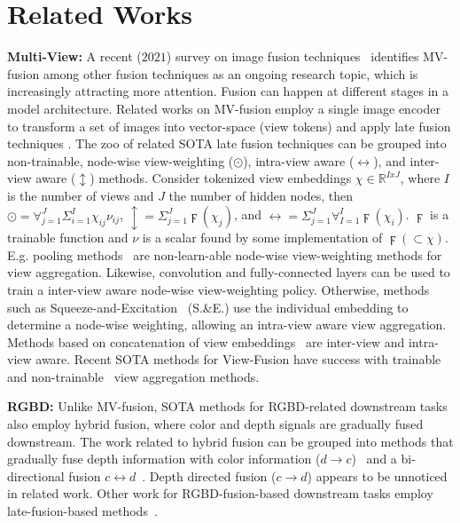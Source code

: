 \section{Related Works}
\textbf{Multi-View:} A recent ($2021$) survey on image fusion techniques~\cite{fusion_survey} identifies MV-fusion among other fusion techniques as an ongoing research topic, which is increasingly attracting more attention. Fusion can happen at different stages in a model architecture. Related works on MV-fusion employ a single image encoder to transform a set of images into vector-space (view tokens) and apply late fusion techniques \cite{mvcnn,View-GCN,MVTN,GVCNN,GIFT,MVFusionNet,RotationNet,MLVCNN,concat1,concat2,concat3,Multi-View_ML,sum_fuse}. The zoo of related SOTA late fusion techniques can be grouped into non-trainable, node-wise view-weighting ($\odot$), intra-view aware ($\leftrightarrow$), and inter-view aware ($\updownarrow$) methods. Consider tokenized view embeddings $\chi \in \mathbb{R}^{IxJ}$, where $I$ is the number of views and $J$ the number of hidden nodes, then $\odot = \forall_{j=1}^{J} \Sigma_{i=1}^{I} \chi_{ij}\nu_{ij}$, $\updownarrow = \Sigma_{j=1}^{J} \digamma(\chi_j)$, and $\leftrightarrow = \Sigma_{j=1}^{J} \forall_{I=1}^{I} \digamma(\chi_i)$. $\digamma$ is a trainable function and $\nu$ is a scalar found by some implementation of $\digamma(\subset \chi)$. E.g. pooling methods~\cite{mvcnn} are non-learn-able node-wise view-weighting methods for view aggregation. Likewise, convolution and fully-connected layers can be used to train a inter-view aware node-wise view-weighting policy. Otherwise, methods such as Squeeze-and-Excitation~\cite{Squeeze} (S.\&E.) use the individual embedding to determine a node-wise weighting, allowing an intra-view aware view aggregation. Methods based on concatenation of view embeddings~\cite{sum_fuse,MLVCNN,View-GCN} are inter-view and intra-view aware. Recent SOTA methods for View-Fusion have success with trainable~\cite{View-GCN} and non-trainable~\cite{MVTN} view aggregation methods.

\textbf{RGBD:} Unlike MV-fusion, SOTA methods for RGBD-related downstream tasks also employ hybrid fusion, where color and depth signals are gradually fused downstream. The work related to hybrid fusion can be grouped into methods that gradually fuse depth information with color information ($d \rightarrow c$)~\cite{RedNet} and a bi-directional fusion $c \leftrightarrow d$~\cite{CMX-rgbdfusion,Symmetric-Cross-modality-Residual-Fusion}. Depth directed fusion ($c\to d$) appears to be unnoticed in related work. Other work for RGBD-fusion-based downstream tasks employ late-fusion-based methods~\cite{Tokenfusion,RGBDfusion_old,RGBD-pretrained,DenseFusion,MVFusionNet}. 

